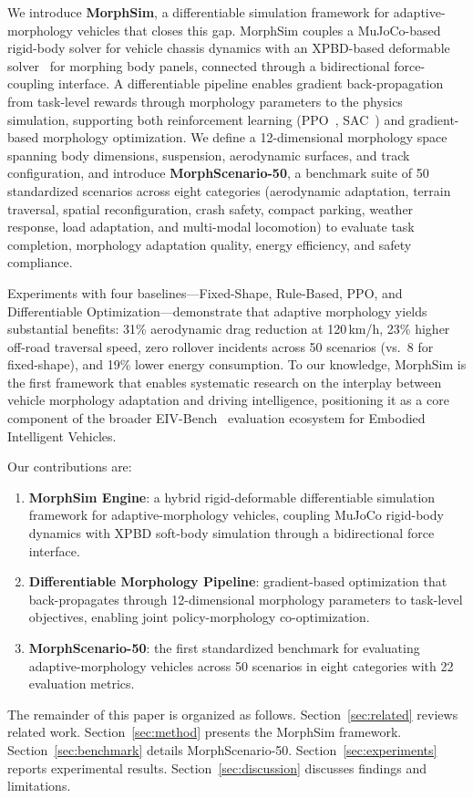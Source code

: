 We introduce \textbf{MorphSim}, a differentiable simulation framework for adaptive-morphology vehicles that closes this gap.
MorphSim couples a MuJoCo-based rigid-body solver for vehicle chassis dynamics with an XPBD-based deformable solver~\cite{xpbd2021,diffxpbd2024} for morphing body panels, connected through a bidirectional force-coupling interface.
A differentiable pipeline enables gradient back-propagation from task-level rewards through morphology parameters to the physics simulation, supporting both reinforcement learning (PPO~\cite{ppo2017}, SAC~\cite{sac2018}) and gradient-based morphology optimization.
We define a 12-dimensional morphology space spanning body dimensions, suspension, aerodynamic surfaces, and track configuration, and introduce \textbf{MorphScenario-50}, a benchmark suite of 50 standardized scenarios across eight categories (aerodynamic adaptation, terrain traversal, spatial reconfiguration, crash safety, compact parking, weather response, load adaptation, and multi-modal locomotion) to evaluate task completion, morphology adaptation quality, energy efficiency, and safety compliance.

Experiments with four baselines---Fixed-Shape, Rule-Based, PPO, and Differentiable Optimization---demonstrate that adaptive morphology yields substantial benefits: 31\% aerodynamic drag reduction at 120\,km/h, 23\% higher off-road traversal speed, zero rollover incidents across 50 scenarios (vs.\ 8 for fixed-shape), and 19\% lower energy consumption.
To our knowledge, MorphSim is the first framework that enables systematic research on the interplay between vehicle morphology adaptation and driving intelligence, positioning it as a core component of the broader EIV-Bench~\cite{eivbench2026} evaluation ecosystem for Embodied Intelligent Vehicles.

Our contributions are:
\begin{enumerate}
    \item \textbf{MorphSim Engine}: a hybrid rigid-deformable differentiable simulation framework for adaptive-morphology vehicles, coupling MuJoCo rigid-body dynamics with XPBD soft-body simulation through a bidirectional force interface.
    \item \textbf{Differentiable Morphology Pipeline}: gradient-based optimization that back-propagates through 12-dimensional morphology parameters to task-level objectives, enabling joint policy-morphology co-optimization.
    \item \textbf{MorphScenario-50}: the first standardized benchmark for evaluating adaptive-morphology vehicles across 50 scenarios in eight categories with 22 evaluation metrics.
\end{enumerate}

The remainder of this paper is organized as follows.
Section~\ref{sec:related} reviews related work.
Section~\ref{sec:method} presents the MorphSim framework.
Section~\ref{sec:benchmark} details MorphScenario-50.
Section~\ref{sec:experiments} reports experimental results.
Section~\ref{sec:discussion} discusses findings and limitations.
